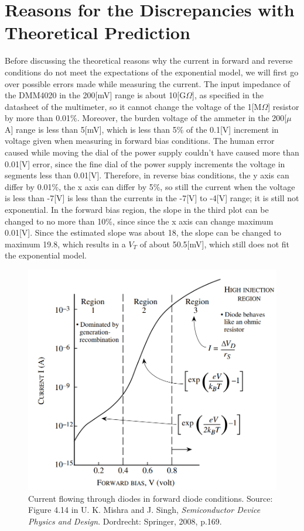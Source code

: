 \documentclass[a4paper, itemph]{oblivoir}
\theoremstyle{definition}
\begin{document}
\section{Reasons for the Discrepancies with Theoretical Prediction}

Before discussing the theoretical reasons why the current in forward and reverse conditions do not meet the expectations of the exponential model, we will first go over possible errors made while measuring the current. The input impedance of the DMM4020 in the 200[mV] range is about 10[G$\Omega$], as specified in the datasheet of the multimeter, so it cannot change the voltage of the 1[M$\Omega$] resistor by more than 0.01\%. Moreover, the burden voltage of the ammeter in the 200[$\mu$A] range is less than 5[mV], which is less than 5\% of the 0.1[V] increment in voltage given when measuring in forward bias conditions. The human error caused while moving the dial of the power supply couldn't have caused more than 0.01[V] error, since the fine dial of the power supply increments the voltage in segments less than 0.01[V]. Therefore, in reverse bias conditions, the y axis can differ by 0.01\%, the x axis can differ by 5\%, so still the current when the voltage is less than -7[V] is less than the currents in the -7[V] to -4[V] range; it is still not exponential. In the forward bias region, the slope in the third plot can be changed to no more than 10\%, since since the x axis can change maximum 0.01[V]. Since the estimated slope was about 18, the slope can be changed to maximum 19.8, which results in a $V_T$ of about 50.5[mV], which still does not fit the exponential model.

\begin{figure}[htb]
    \centering
    \includegraphics[width=0.5\linewidth]{nonideal.PNG}
    \caption{Current flowing through diodes in forward diode conditions. Source: Figure 4.14 in U. K. Mishra and J. Singh, \textit{Semiconductor Device Physics and Design}. Dordrecht: Springer, 2008, p.169.}
\end{figure}
\end{document}
